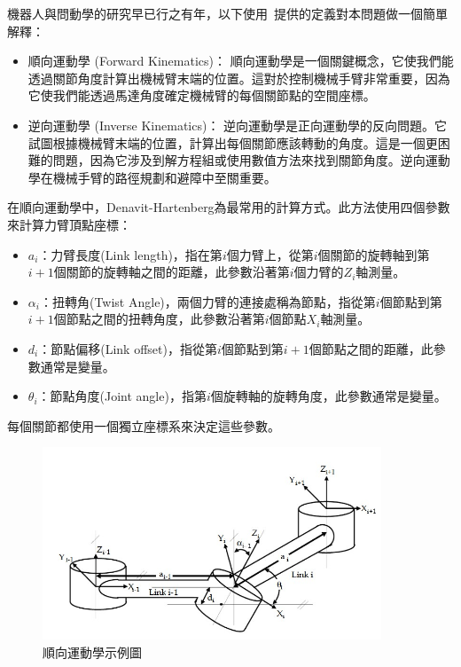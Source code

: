 \documentclass[class=NCU_thesis, crop=false]{standalone}
\begin{document}
機器人與問動學的研究早已行之有年，以下使用~\cite{kucuk2006robot}提供的定義對本問題做一個簡單解釋：
\begin{itemize}
    \item 順向運動學 (Forward Kinematics)： 順向運動學是一個關鍵概念，它使我們能透過關節角度計算出機械臂末端的位置。這對於控制機械手臂非常重要，因為它使我們能透過馬達角度確定機械臂的每個關節點的空間座標。

    \item 逆向運動學 (Inverse Kinematics)： 逆向運動學是正向運動學的反向問題。它試圖根據機械臂末端的位置，計算出每個關節應該轉動的角度。這是一個更困難的問題，因為它涉及到解方程組或使用數值方法來找到關節角度。逆向運動學在機械手臂的路徑規劃和避障中至關重要。
\end{itemize}

在順向運動學中，Denavit-Hartenberg為最常用的計算方式。此方法使用四個參數來計算力臂頂點座標： 
\begin{itemize}
    \item $a_{i}$：力臂長度(Link length)，指在第$i$個力臂上，從第$i$個關節的旋轉軸到第$i+1$個關節的旋轉軸之間的距離，此參數沿著第$i$個力臂的$Z_{i}$軸測量。
    \item $\alpha_{i}$：扭轉角(Twist Angle)，兩個力臂的連接處稱為節點，指從第$i$個節點到第$i+1$個節點之間的扭轉角度，此參數沿著第$i$個節點$X_{i}$軸測量。
    \item $d_{i}$：節點偏移(Link offset)，指從第$i$個節點到第$i+1$個節點之間的距離，此參數通常是變量。
    \item $\theta_{i}$：節點角度(Joint angle)，指第$i$個旋轉軸的旋轉角度，此參數通常是變量。
\end{itemize}
每個關節都使用一個獨立座標系來決定這些參數。

\begin{figure}[htbp]
    \centering
    \includegraphics[width=0.9\textwidth]{figures/Coordinate frame assignment for a general manipulator.jpg}
\caption{順向運動學示例圖}
\end{figure}
\end{document}
